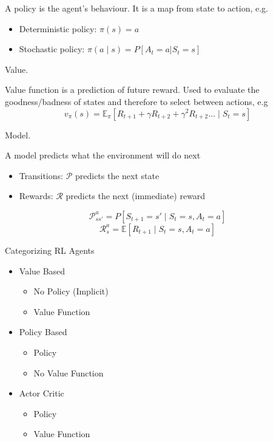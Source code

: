 \documentclass[english]{article}
\newenvironment{grey}{\color{blue}}{\ignorespacesafterend}
\begin{document}
A policy is the agent's behaviour. It is a map from state to action, e.g.
\begin{itemize}
    \item Deterministic policy: $\pi(s) = a$
    \item Stochastic policy: $\pi(a\mid s) = P[A_t = a|S_t = s]$ 
\end{itemize}



\item {Value}.

Value function is a prediction of future reward. Used to evaluate the goodness/badness of states and therefore to select between actions, e.g
\[ v_\pi(s) = \mathbb{E}_\pi[R_{t+1} + \gamma R_{t+2} + \gamma^2 R_{t+2} \dots \mid S_t = s] \]



\item {Model}.

A model predicts what the environment will do next
\begin{itemize}
    \item Transitions: $\mathcal{P}$ predicts the next state
    \item Rewards: $\mathcal{R}$ predicts the next (immediate) reward
\end{itemize}

\[ \mathcal{P}^a_{s s'} = P[S_{t+1} = s' \mid S_t = s, A_t = a] \]
\[ \mathcal{R}^a_{s} = \mathbb{E}[R_{t+1} \mid S_t = s, A_t = a] \]



\item {Categorizing RL Agents}
 
 
\begin{itemize}
    \item Value Based
    \begin{itemize}
        \item \begin{grey} No Policy (Implicit)\end{grey}
        \item Value Function
    \end{itemize}
    \item Policy Based
    \begin{itemize}
        \item Policy
        \item \begin{grey}No Value Function\end{grey}
    \end{itemize}
    \item Actor Critic
    \begin{itemize}
        \item Policy
        \item Value Function
    \end{itemize}
\end{itemize}
\end{document}
